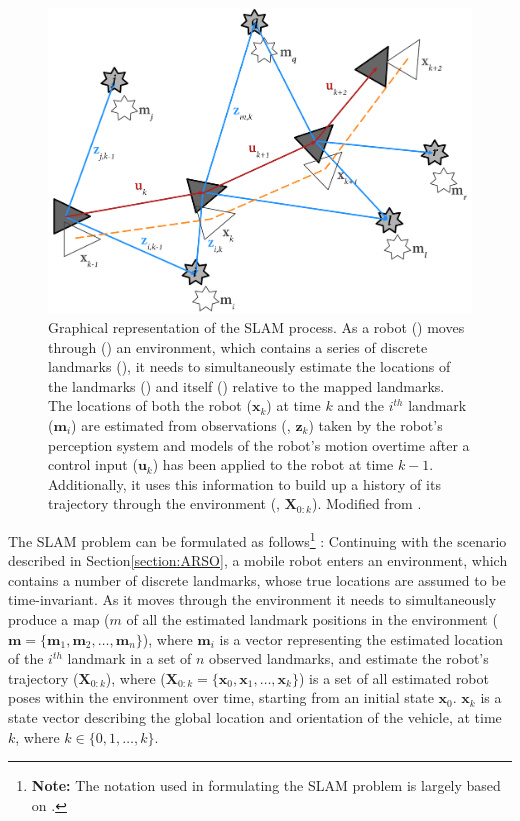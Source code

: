\begin{figure}[H]
	\centering
	\includegraphics[width=0.7\linewidth]{"figs/slam"}
	
	\caption[Graphical representation of SLAM process]{Graphical representation of the SLAM  process. As a robot (\robot) moves through (\redline) an environment, which contains a series of discrete landmarks (\landmark), it needs to simultaneously estimate the locations of the landmarks (\landmarkest) and itself (\robotest) relative to the mapped landmarks.  The locations of both the robot ($\mathbf{x}_{k}$) at time $k$ and the $i^{th}$ landmark ($\mathbf{m}_{i}$) are estimated from observations (\bluearrow, $\mathbf{z}_{k}$) taken by the robot's perception system and models of the robot's motion overtime after a control input ($\mathbf{u}_{k}$) has been applied to the robot at time $k-1$. Additionally, it uses this information to build up a history of its trajectory through the environment (\orangedashed, $\mathbf{X}_{0:k}$). Modified from \cite{Bailey2006}.}
	\label{fig:slam-problem}
\end{figure}

The SLAM problem can be formulated as follows\footnote{\textbf{Note:} The notation used in formulating the SLAM problem is largely based on \cite{Bailey2006b}.} : Continuing with the scenario described in Section\ref{section:ARSO}, a mobile robot enters an environment, which contains a number of discrete landmarks, whose true locations are assumed to be time-invariant. As it moves through the environment it needs to simultaneously produce a map ($m$ of all the estimated landmark positions in the environment ($\mathbf{m}=\{\mathbf{m}_1, \mathbf{m}_2,\dots{}, \mathbf{m}_n\}$), where $\mathbf{m}_{i}$ is a vector representing the estimated location of the $i^{th}$ landmark in a set of $n$ observed landmarks, and estimate the robot's trajectory ($\mathbf{X}_{0:k}$), where ($\mathbf{X}_{0:k}=\{\mathbf{x}_{0}, \mathbf{x}_{1}, \dots{}, \mathbf{x}_{k}\}$) is a set of all estimated robot poses within the environment over time, starting from an initial state $\mathbf{x}_{0}$. $\mathbf{x}_{k}$ is a state vector describing the global location and orientation of the vehicle, at time $k$, where  $k \in{} \{0,1,\dots{},k\}$. 

